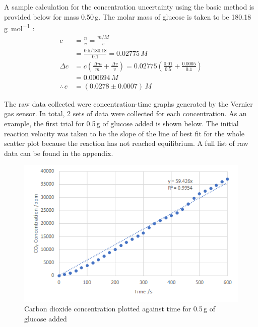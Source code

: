 \documentclass{article}
\begin{document}
A sample calculation for the concentration uncertainty using the basic method is provided below for mass 0.50\,\si{g}. The molar mass of glucose is taken to be 180.18\,\si{g.mol^{-1}} \parencite{data-booklet}:
\begin{align*}
    c &= \frac{n}{v} = \frac{m/M}{v} \\
    &= \frac{0.5/180.18}{0.1} = 0.02775\,\si{M} \\  %
    \Delta c &= c\left(\frac{\Delta m}{m} + \frac{\Delta v}{v}\right) = 0.02775\left(\frac{0.01}{0.5} + \frac{0.0005}{0.1}\right) \\
    &= 0.000694\,\si{M} \\
    \therefore\,c &= (0.0278 \pm 0.0007)\,\si{M}
\end{align*}

\newpage

The raw data collected were concentration-time graphs generated by the Vernier  gas sensor. In total, 2 sets of data were collected for each concentration. As an example, the first trial for 0.5\,\si{g} of glucose added is shown below. The initial reaction velocity was taken to be the slope of the line of best fit for the whole scatter plot because the reaction has not reached equilibrium. A full list of raw data can be found in the appendix.  %
\begin{figure}[H]
    \renewcommand{\figurename}{Graph}
    \setcounter{figure}{1}
    \centering
    \includegraphics{figures/graph_02.png}
    \vspace*{-12pt}
    \caption{Carbon dioxide concentration plotted against time for 0.5\,\si{g} of glucose added}
    \label{fig:graph2}
\end{figure}
\end{document}
